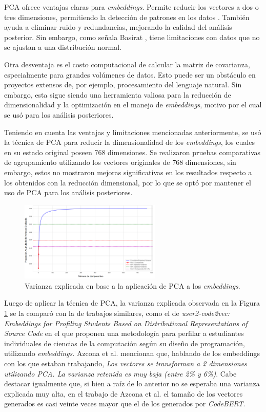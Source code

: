 \documentclass[11pt,a4paper,twoside,openany]{tesis}
\begin{document}
PCA ofrece ventajas claras para \emph{embeddings}. Permite reducir los vectores a dos o tres dimensiones, permitiendo la detección de patrones en los datos \cite{pca-musil}. También ayuda a eliminar ruido y redundancias, mejorando la calidad del análisis posterior. Sin embargo, como señala Basirat \cite{pca-basirat}, tiene limitaciones con datos que no se ajustan a una distribución normal.

Otra desventaja es el costo computacional de calcular la matriz de covarianza, especialmente para grandes volúmenes de datos. Esto puede ser un obstáculo en proyectos extensos de, por ejemplo, procesamiento del lenguaje natural\cite{pca-basirat}. Sin embargo, esta sigue siendo una herramienta valiosa para la reducción de dimensionalidad y la optimización en el manejo de \emph{embeddings}, motivo por el cual se usó para los análisis posteriores.

Teniendo en cuenta las ventajas y limitaciones mencionadas anteriormente, se usó la técnica de PCA para reducir la dimensionalidad de los \emph{embeddings}, los cuales en su estado original poseen 768 dimensiones. Se realizaron pruebas comparativas de agrupamiento utilizando los vectores originales de 768 dimensiones, sin embargo, estos no mostraron mejoras significativas en los resultados respecto a los obtenidos con la reducción dimensional, por lo que se optó por mantener el uso de PCA para los análisis posteriores.

\begin{figure}[H]
    \centering
    \includegraphics[width=0.6\textwidth]{imagenes/varianza-explicada.png}
    \caption{Varianza explicada en base a la aplicación de PCA a los \emph{embeddings}.}
    \label{varianzaPCA}
\end{figure}

Luego de aplicar la técnica de PCA, la varianza explicada observada en la Figura \ref{varianzaPCA} se la comparó con la de trabajos similares, como el de \emph{user2-code2vec: Embeddings for Profiling Students Based on Distributional Representations of Source Code} \cite{user2code} en el que proponen una metodología para perfilar a estudiantes individuales de ciencias de la computación según su diseño de programación, utilizando \emph{embeddings}. Azcona et al. mencionan que, hablando de los embeddings con los que estaban trabajando, \emph{Los vectores se transforman a 2 dimensiones utilizando PCA. La varianza retenida es muy baja (entre 2\% y 6\%)}. Cabe destacar igualmente que, si bien a raíz de lo anterior no se esperaba una varianza explicada muy alta, en el trabajo de Azcona et al. el tamaño de los vectores generados es casi veinte veces mayor que el de los generados por \emph{CodeBERT}.
\end{document}
